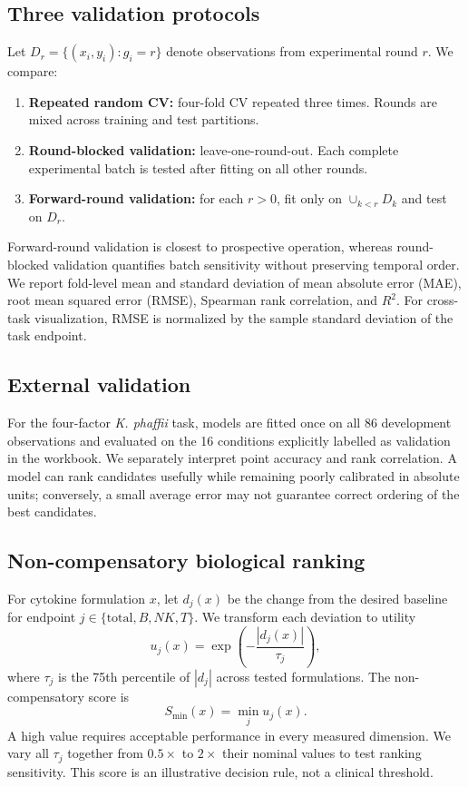 \documentclass[11pt]{article}
\newcommand{\kp}{\textit{K. phaffii}}
\begin{document}
\subsection{Three validation protocols}
Let $D_r=\{(x_i,y_i): g_i=r\}$ denote observations from experimental round $r$. We compare:

\begin{enumerate}[leftmargin=1.5em]
\item \textbf{Repeated random CV:} four-fold CV repeated three times. Rounds are mixed across training and test partitions.
\item \textbf{Round-blocked validation:} leave-one-round-out. Each complete experimental batch is tested after fitting on all other rounds.
\item \textbf{Forward-round validation:} for each $r>0$, fit only on $\cup_{k<r}D_k$ and test on $D_r$.
\end{enumerate}

Forward-round validation is closest to prospective operation, whereas round-blocked validation quantifies batch sensitivity without preserving temporal order. We report fold-level mean and standard deviation of mean absolute error (MAE), root mean squared error (RMSE), Spearman rank correlation, and $R^2$. For cross-task visualization, RMSE is normalized by the sample standard deviation of the task endpoint.

\subsection{External validation}
For the four-factor \kp{} task, models are fitted once on all 86 development observations and evaluated on the 16 conditions explicitly labelled as validation in the workbook. We separately interpret point accuracy and rank correlation. A model can rank candidates usefully while remaining poorly calibrated in absolute units; conversely, a small average error may not guarantee correct ordering of the best candidates.

\subsection{Non-compensatory biological ranking}
For cytokine formulation $x$, let $d_j(x)$ be the change from the desired baseline for endpoint $j\in\{\text{total},B,NK,T\}$. We transform each deviation to utility
\begin{equation}
 u_j(x)=\exp\left(-\frac{|d_j(x)|}{\tau_j}\right),
\end{equation}
where $\tau_j$ is the 75th percentile of $|d_j|$ across tested formulations. The non-compensatory score is
\begin{equation}
 S_{\min}(x)=\min_j u_j(x).
\label{eq:minscore}
\end{equation}
A high value requires acceptable performance in every measured dimension. We vary all $\tau_j$ together from $0.5\times$ to $2\times$ their nominal values to test ranking sensitivity. This score is an illustrative decision rule, not a clinical threshold.
\end{document}
